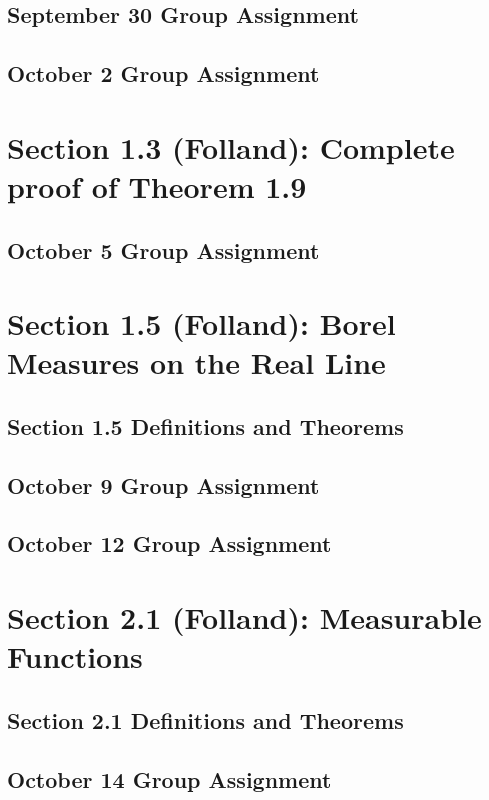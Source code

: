 \documentclass[11pt]{amsart}
\begin{document}
 \subsection{September 30 Group Assignment}


 \subsection{October 2 Group Assignment}

 \section{Section 1.3 (Folland): Complete proof of Theorem 1.9}

 \subsection{October 5 Group Assignment}

 \section{Section 1.5 (Folland): Borel Measures on the Real Line}
 \subsection{Section 1.5 Definitions and Theorems}
  
 
 \subsection{October 9 Group Assignment}


\subsection{October 12 Group Assignment}

\section{Section 2.1 (Folland): Measurable Functions}
\subsection{Section 2.1 Definitions and Theorems}
  
 
\subsection{October 14 Group Assignment}

\end{document}
